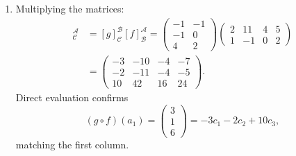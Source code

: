\begin{exercisesolution}
\begin{enumerate}[label=\textbf{(\alph*)}]
\begin{enumerate}[label=\textbf{(\roman*)}]
        \item Multiplying the matrices:
        \begin{align*}
        [g \circ f]_{\mathcal{C}}^{\mathcal{A}} &= [g]_{\mathcal{C}}^{\mathcal{B}} [f]_{\mathcal{B}}^{\mathcal{A}}
        = \begin{pmatrix} -1 & -1 \\ -1 & 0 \\ 4 & 2 \end{pmatrix} \begin{pmatrix} 2 & 11 & 4 & 5 \\ 1 & -1 & 0 & 2 \end{pmatrix} \\
        &= \begin{pmatrix}
        -3 & -10 & -4 & -7 \\
        -2 & -11 & -4 & -5 \\
        10 & 42 & 16 & 24
        \end{pmatrix}.
        \end{align*}
        Direct evaluation confirms
        \[
        (g \circ f)(a_1) = \begin{pmatrix} 3 \\ 1 \\ 6 \end{pmatrix} = -3 c_1 - 2 c_2 + 10 c_3,
        \]
        matching the first column.
    \end{enumerate}
\end{enumerate}
\end{exercisesolution}
